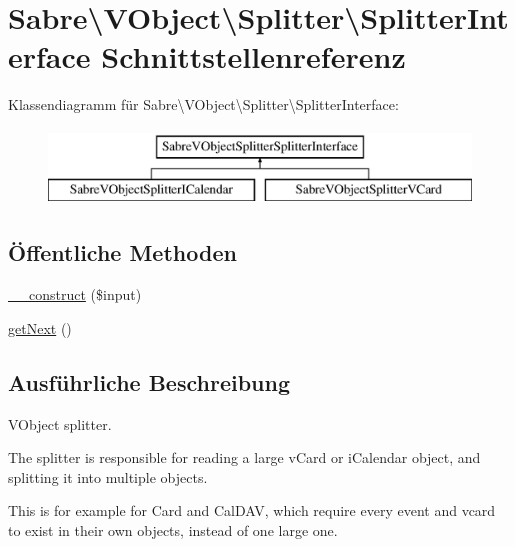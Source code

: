 \hypertarget{interface_sabre_1_1_v_object_1_1_splitter_1_1_splitter_interface}{}\section{Sabre\textbackslash{}V\+Object\textbackslash{}Splitter\textbackslash{}Splitter\+Interface Schnittstellenreferenz}
\label{interface_sabre_1_1_v_object_1_1_splitter_1_1_splitter_interface}
Klassendiagramm für Sabre\textbackslash{}V\+Object\textbackslash{}Splitter\textbackslash{}Splitter\+Interface\+:\begin{figure}[H]
\begin{center}
\leavevmode
\includegraphics[height=2.000000cm]{interface_sabre_1_1_v_object_1_1_splitter_1_1_splitter_interface}
\end{center}
\end{figure}
\subsection*{Öffentliche Methoden}
\begin{DoxyCompactItemize}
\item 
\mbox{\hyperlink{interface_sabre_1_1_v_object_1_1_splitter_1_1_splitter_interface_a41835a43cee318c5837cd48f7ab919b8}{\+\_\+\+\_\+construct}} (\$input)
\item 
\mbox{\hyperlink{interface_sabre_1_1_v_object_1_1_splitter_1_1_splitter_interface_ae8684178a369fdafebc51e64a5b76ab8}{get\+Next}} ()
\end{DoxyCompactItemize}


\subsection{Ausführliche Beschreibung}
V\+Object splitter.

The splitter is responsible for reading a large v\+Card or i\+Calendar object, and splitting it into multiple objects.

This is for example for Card and Cal\+D\+AV, which require every event and vcard to exist in their own objects, instead of one large one.

